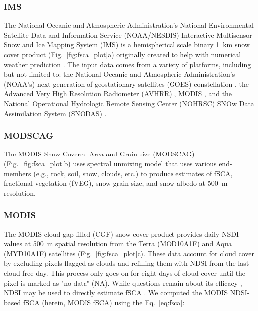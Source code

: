 \clearpage
\hypertarget{ch4-methods-3}{\subsubsection{IMS}\label{ch4-methods-3}}

The National Oceanic and Atmospheric Administration’s National Environmental Satellite Data and Information Service (NOAA/NESDIS) Interactive Multisensor Snow and Ice Mapping System (IMS) is a hemispherical scale binary 1~km snow cover product (Fig.~\ref{fig:fsca_plot}a) originally created to help with numerical weather prediction 
\citep{ramsayInteractiveMultisensorSnow1998, helfrichEnhancementsForthcomingDevelopments2007}. The input data comes from a variety of platforms, including but not limited to: the National Oceanic and Atmospheric Administration's (NOAA's) next generation of geostationary satellites (GOES) constellation \citep{menzelIntroducingGOESIFirst1994}, the Advanced Very High Resolution Radiometer (AVHRR) \citep{cracknellAdvancedVeryHigh1997}, MODIS \citep{salomonsonMODISAdvancedFacility1989}, and the National Operational Hydrologic Remote Sensing Center (NOHRSC) SNOw Data Assimilation System (SNODAS) \citep{barrettandrewNationalOperationalHydrologic2003}.

\hypertarget{ch4-methods-4}{\subsubsection{MODSCAG}\label{ch4-methods-4}}

The MODIS Snow-Covered Area and Grain size (MODSCAG) (Fig.~\ref{fig:fsca_plot}b) \citep{painterRetrievalSubpixelSnow2009} uses spectral unmixing model that uses various end-members (e.g., rock, soil, snow, clouds, etc.) to produce estimates of fSCA, fractional vegetation (fVEG), snow grain size, and snow albedo at 500~m resolution.

\hypertarget{ch4-methods-5}{\subsubsection{MODIS}\label{ch4-methods-5}}

The MODIS cloud-gap-filled (CGF) snow cover product \citep{hallEvaluationMODISVIIRS2019} provides daily NSDI values at 500~m spatial resolution from the Terra (MOD10A1F) and Aqua (MYD10A1F) satellites (Fig.~\ref{fig:fsca_plot}c). These data account for cloud cover by excluding pixels flagged as clouds and refilling them with NDSI from the last cloud-free day. This process only goes on for eight days of cloud cover until the pixel is marked as "no data" (NA). While questions remain about its efficacy \citep{nolinRecentAdvancesRemote2010, rittgerAssessmentMethodsMapping2013}, NDSI may be used to directly estimate fSCA \citep{salomonsonEstimatingFractionalSnow2004, salomonsonDevelopmentAquaMODIS2006,stillingerLandsatMODISVIIRS2023}. We computed the MODIS NDSI-based fSCA (herein, MODIS fSCA) using the Eq.~\ref{eq:fsca}:

